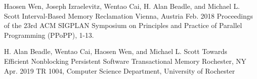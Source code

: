 

\begin{cventries}

  \cvpublication
    {Haosen Wen, Joseph Izraelevitz, Wentao Cai, H. Alan Beadle, and Michael L. Scott} %
    {Interval-Based Memory Reclamation} %
    {Vienna, Austria} %
    {Feb. 2018} %
    {Proceedings of the 23rd ACM SIGPLAN Symposium on Principles and Practice of Parallel Programming (PPoPP), 1-13.} %

  \cvpublication
    {H. Alan Beadle, Wentao Cai, Haosen Wen, and Michael L. Scott} %
    {Towards Efficient Nonblocking Persistent Software Transactional Memory} %
    {Rochester, NY} %
    {Apr. 2019} %
    {TR 1004, Computer Science Department, University of Rochester} %

\end{cventries}
